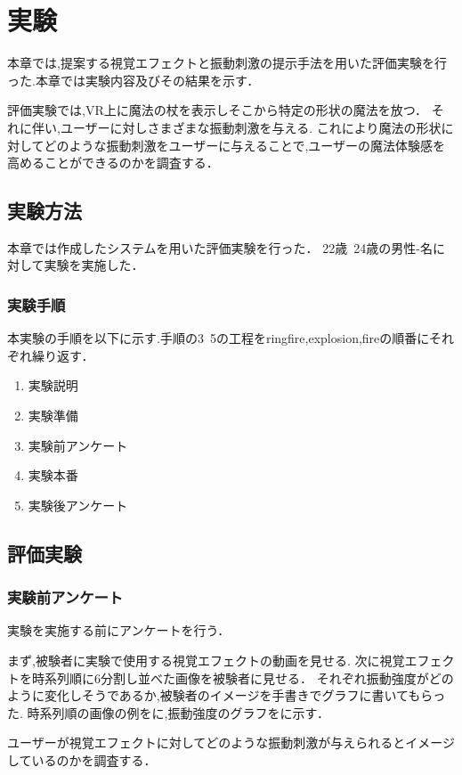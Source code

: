 \chapter{実験}
本章では,提案する視覚エフェクトと振動刺激の提示手法を用いた評価実験を行った.本章では実験内容及びその結果を示す．

評価実験では,VR上に魔法の杖を表示しそこから特定の形状の魔法を放つ．
それに伴い,ユーザーに対しさまざまな振動刺激を与える.
これにより魔法の形状に対してどのような振動刺激をユーザーに与えることで,ユーザーの魔法体験感を高めることができるのかを調査する．

\section{実験方法}
本章では作成したシステムを用いた評価実験を行った．
22歳~24歳の男性-名に対して実験を実施した．

\subsection{実験手順}
本実験の手順を以下に示す.手順の3~5の工程をringfire,explosion,fireの順番にそれぞれ繰り返す．

\begin{enumerate}
    \item 実験説明
    \item 実験準備
    \item 実験前アンケート
    \item 実験本番
    \item 実験後アンケート
\end{enumerate}

\section{評価実験}
\subsection{実験前アンケート}
実験を実施する前にアンケートを行う．

まず,被験者に実験で使用する視覚エフェクトの動画を見せる.
次に視覚エフェクトを時系列順に6分割し並べた画像を被験者に見せる．
それぞれ振動強度がどのように変化しそうであるか,被験者のイメージを手書きでグラフに書いてもらった.
時系列順の画像の例をに,振動強度のグラフをに示す．

ユーザーが視覚エフェクトに対してどのような振動刺激が与えられるとイメージしているのかを調査する．

